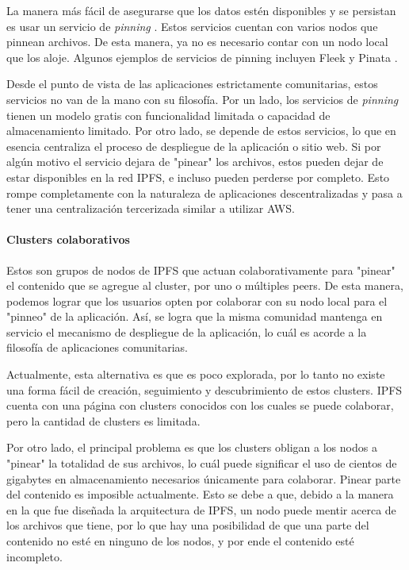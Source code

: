 La manera más fácil de asegurarse que los datos estén disponibles y se persistan es usar un servicio de \textit{pinning} \cite{pinning-services}. Estos servicios cuentan con varios nodos que pinnean archivos. De esta manera, ya no es necesario contar con un nodo local que los aloje. Algunos ejemplos de servicios de pinning incluyen Fleek \cite{fleek} y Pinata \cite{pinata}.

Desde el punto de vista de las aplicaciones estrictamente comunitarias, estos servicios no van de la mano con su filosofía. Por un lado, los servicios de \textit{pinning} tienen un modelo gratis con funcionalidad limitada o capacidad de almacenamiento limitado. Por otro lado, se depende de estos servicios, lo que en esencia centraliza el proceso de despliegue de la aplicación o sitio web. Si por algún motivo el servicio dejara de "pinear" los archivos, estos pueden dejar de estar disponibles en la red IPFS, e incluso pueden perderse por completo. Esto rompe completamente con la naturaleza de aplicaciones descentralizadas y pasa a tener una centralización tercerizada similar a utilizar AWS.

\paragraph{Clusters colaborativos}

Estos son grupos de nodos de IPFS que actuan colaborativamente para "pinear" el contenido que se agregue al cluster, por uno o múltiples peers. De esta manera, podemos lograr que los usuarios opten por colaborar con su nodo local para el "pinneo" de la aplicación. Así, se logra que la misma comunidad mantenga en servicio el mecanismo de despliegue de la aplicación, lo cuál es acorde a la filosofía de aplicaciones comunitarias.

Actualmente, esta alternativa es que es poco explorada, por lo tanto no existe una forma fácil de creación, seguimiento y descubrimiento de estos clusters. IPFS cuenta con una página con clusters conocidos con los cuales se puede colaborar, pero la cantidad de clusters es limitada.

Por otro lado, el principal problema es que los clusters obligan a los nodos a "pinear" la totalidad de sus archivos, lo cuál puede significar el uso de cientos de gigabytes en almacenamiento necesarios únicamente para colaborar. Pinear parte del contenido es imposible actualmente. Esto se debe a que, debido a la manera en la que fue diseñada la arquitectura de IPFS, un nodo puede mentir acerca de los archivos que tiene, por lo que hay una posibilidad de que una parte del contenido no esté en ninguno de los nodos, y por ende el contenido esté incompleto.

